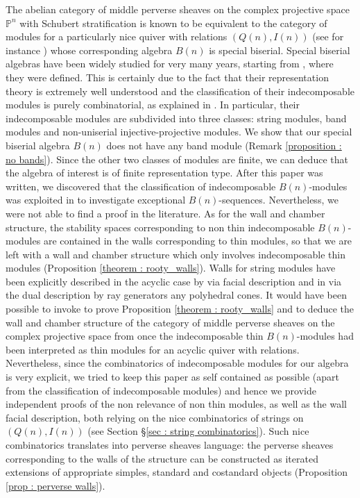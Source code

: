 \documentclass[11pt]{amsart}
\theoremstyle{definition}
\begin{document}
The abelian category of middle perverse sheaves on the complex projective space $\mathbb{P}^n$ with Schubert stratification is known to be equivalent to the category of modules for a particularly nice quiver with relations $(Q(n), I(n))$ (see for instance \cite[Example 1.1]{stroppelTQFT}) whose corresponding algebra $B(n)$ is special biserial. Special biserial algebras have been widely studied for very many years, starting from \cite{SW}, where they were defined. This is certainly due to the fact that their representation theory is extremely well understood and the classification of their indecomposable modules is purely combinatorial, as explained in \cite{Butler-Ringel, WW}. In particular, their indecomposable modules are subdivided into three classes: string modules, band modules and non-uniserial injective-projective modules. We show that our special biserial algebra $B(n)$ does not have any band module (Remark \ref{proposition : no bands}). Since the other two classes of modules are finite, we can deduce that the algebra of interest is of finite representation type. After this paper was written, we discovered that the classification of indecomposable $B(n)$-modules was exploited in \cite{Pe} to investigate exceptional $B(n)$-sequences. Nevertheless, we were not able to find a proof in the literature. As for the wall and chamber structure, the stability spaces corresponding to non thin indecomposable $B(n)$-modules are contained in the walls corresponding to thin modules, so that we are left with a wall and chamber structure which only involves indecomposable thin modules (Proposition \ref{theorem : rooty_walls}). Walls for string modules have been explicitly described in the acyclic case by \cite{asai} via facial description and in \cite{string_and_band} via the dual description by ray generators any polyhedral cones. It would have been possible to invoke \cite{string_and_band} to prove Proposition \ref{theorem : rooty_walls} and to deduce the wall and chamber structure of the category of middle perverse sheaves on the complex projective space from \cite{string_and_band} once the indecomposable thin $B(n)$-modules had been interpreted as thin modules for an acyclic quiver with relations. Nevertheless, since the combinatorics of indecomposable modules for our algebra is very explicit, we tried to keep this paper as self contained as possible (apart from the classification of indecomposable modules) and hence we provide independent proofs of the non relevance of non thin modules, as well as
the wall facial description, 
both relying on the nice combinatorics of strings on $(Q(n), I(n))$ (see Section \S\ref{sec : string combinatorics}). Such nice combinatorics translates into perverse sheaves language: the perverse sheaves corresponding to the walls of the structure can be constructed as iterated extensions of appropriate simples, standard and costandard objects (Proposition \ref{prop : perverse walls}). 
\end{document}
